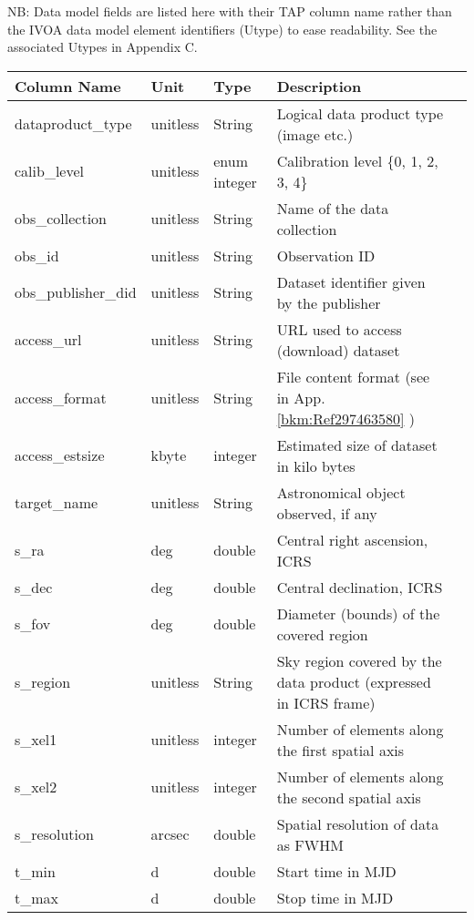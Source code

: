 \documentclass[11pt,a4paper]{ivoa}
\begin{document}
NB: Data model fields are listed here with their TAP column name rather than the IVOA data model element identifiers
(Utype) to ease readability.  See the associated Utypes in Appendix C. 

\begin{longtable}{|l|p{}|p{}|p{}|p{}|}
\hline
Column Name & Unit & Type & Description\\\hline
dataproduct\_type & unitless & String & Logical data product type (image etc.)\\\hline
calib\_level & unitless & enum integer  & Calibration level \{0, 1, 2, 3, 4\} \\\hline
obs\_collection & unitless & String & Name of the data collection \\\hline
obs\_id & unitless & String & Observation ID \\\hline
obs\_publisher\_did & unitless & String & Dataset identifier given by the publisher\\\hline
access\_url & unitless & String & URL used to access (download) dataset\\\hline
access\_format & unitless & String & File content format (see in App. \ref{bkm:Ref297463580} )\\\hline
access\_estsize & kbyte & integer & Estimated size of dataset in kilo bytes\\\hline
target\_name & unitless & String & Astronomical object observed, if any\\\hline
s\_ra & deg & double & Central right ascension, ICRS\\\hline
s\_dec & deg & double & Central declination, ICRS\\\hline
s\_fov & deg & double & Diameter (bounds) of the covered region \\\hline
s\_region & unitless & String & Sky region covered by the  data product (expressed in ICRS frame)\\\hline
s\_xel1 & unitless & integer & Number of elements along the first spatial axis\\\hline
s\_xel2 & unitless & integer & Number of elements along the second spatial axis\\\hline
s\_resolution & arcsec & double & Spatial resolution of data as FWHM\\\hline
t\_min & d & double & Start time in MJD\\\hline
t\_max & d & double & Stop time in MJD\\\hline

\end{longtable}
\end{document}
